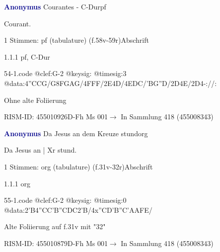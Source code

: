 \documentclass[twocolumn, 12pt]{book}
\begin{document}
\par \vspace{16pt} \textcolor{darkblue}{\textbf{Anonymus  }}\hfillplus{\textbf{[54]}}\newline Courantes - C-Dur\newline pf
\par \begin{itshape}[f.58v, at left:] Courant.\end{itshape} 
\par \textcolor{darkblue}{}  1 Stimmen: pf (tabulature)  (f.58v-59r)\newline Abschrift
\par 1.1.1  pf, C-Dur  
\begin{filecontents*}{54-1.code}
@clef:G-2
@keysig:
@timesig:3
@data:4''CCG/G{8FGAG}/4FFF/2E4D/4EDC/'BG''D/2D4E/2D4-://:
\end{filecontents*}
\newline %
\par Ohne alte Foliierung
\par RISM-ID: 455010926\newline D-Fh  Ms 001\newline $\rightarrow$ In Sammlung 418 (455008343)
      
\par \vspace{16pt} \textcolor{darkblue}{\textbf{Anonymus  }}\hfillplus{\textbf{[55]}}\newline Da Jesus an dem Kreuze stund\newline org
\par \begin{itshape}[f.31v, at left:] Da Jesus an | Xr stund.\end{itshape} 
\par \textcolor{darkblue}{}  1 Stimmen: org (tabulature)  (f.31v-32r)\newline Abschrift
\par 1.1.1  org  
\begin{filecontents*}{55-1.code}
@clef:G-2
@keysig:
@timesig:0
@data:2'B4''CC'B''CDC2'B/4x''CD'B''C'AAFE/
\end{filecontents*}
\newline %
\par Alte Foliierung auf f.31v mit "32"
\par RISM-ID: 455010879\newline D-Fh  Ms 001\newline $\rightarrow$ In Sammlung 418 (455008343)
      
\end{document}
